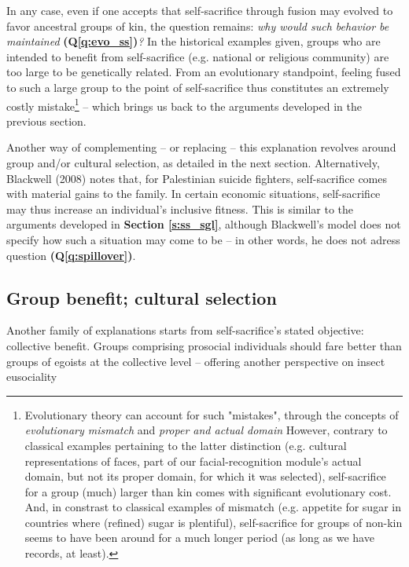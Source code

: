 \documentclass[a4paper,12pt]{report}
\begin{document}
In any case, even if one accepts that self-sacrifice through fusion may evolved
to favor ancestral groups of kin, the question remains: \emph{why would such behavior be
maintained} \textbf{(Q\ref{q:evo_ss})}\emph{?} In the historical examples given, groups who are intended to benefit
from self-sacrifice (e.g. national or religious community) are too large to be
genetically related. 
From an evolutionary standpoint, feeling fused to such a large group
to the point of self-sacrifice thus constitutes an extremely costly mistake\footnote{
    Evolutionary theory can account for such "mistakes", through the concepts of
    \emph{evolutionary mismatch} %
    and \emph{proper \textnormal{and} actual domain} %
    However, contrary to classical examples pertaining to the latter distinction
    (e.g. cultural representations of faces, part of our facial-recognition module's actual
    domain, but not its proper domain, for which it was selected), self-sacrifice
    for a group (much) larger than kin comes with significant evolutionary cost.
    And, in constrast to classical examples of mismatch (e.g. appetite for sugar in 
    countries where (refined) sugar is plentiful), self-sacrifice for groups of non-kin
    seems to have been around for a much longer period (as long as we have records, at least).
} –
which brings us back to the arguments developed in the previous section.


Another way of complementing – or replacing – this explanation revolves around group and/or cultural selection, as detailed in the next section. Alternatively, Blackwell (2008) notes that, for Palestinian suicide fighters, self-sacrifice comes with material gains to the family. In certain economic situations, self-sacrifice may thus increase an individual’s inclusive fitness.
This is similar to the arguments developed in \textbf{Section \ref{s:ss_sgl}}, although
Blackwell’s model does not specify how such a situation may come to be –
in other words, he does not adress question \textbf{(Q\ref{q:spillover})}.

\subsection{Group benefit; cultural selection}
Another family of explanations starts from self-sacrifice’s stated objective:
collective benefit. Groups comprising prosocial individuals should fare better
than groups of egoists at the collective level – offering another perspective on insect
eusociality %
\end{document}
